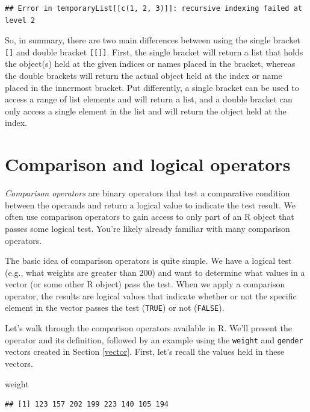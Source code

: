 \documentclass[
]{krantz}
\newenvironment{Shaded}{\begin{snugshade}}{\end{snugshade}}
\newcommand{\NormalTok}[1]{#1}
\begin{document}
\begin{verbatim}
## Error in temporaryList[[c(1, 2, 3)]]: recursive indexing failed at level 2
\end{verbatim}

So, in summary, there are two main differences between using the single bracket \texttt{{[}{]}} and double bracket \texttt{{[}{[}{]}{]}}. First, the single bracket will return a list that holds the object(s) held at the given indices or names placed in the bracket, whereas the double brackets will return the actual object held at the index or name placed in the innermost bracket. Put differently, a single bracket can be used to access a range of list elements and will return a list, and a double bracket can only access a single element in the list and will return the object held at the index.

\hypertarget{logicalOperators}{%
\section{Comparison and logical operators}\label{logicalOperators}}

\emph{Comparison operators} are binary operators that test a comparative condition between the operands and return a logical value to indicate the test result. We often use comparison operators to gain access to only part of an R object that passes some logical test. You're likely already familiar with many comparison operators.

The basic idea of comparison operators is quite simple. We have a logical test (e.g., what weights are greater than 200) and want to determine what values in a vector (or some other R object) pass the test. When we apply a comparison operator, the results are logical values that indicate whether or not the specific element in the vector passes the test (\texttt{TRUE}) or not (\texttt{FALSE}).

Let's walk through the comparison operators available in R. We'll present the operator and its definition, followed by an example using the \texttt{weight} and \texttt{gender} vectors created in Section \ref{vector}. First, let's recall the values held in these vectors.

\begin{Shaded}
\begin{Highlighting}[]
\NormalTok{weight}
\end{Highlighting}
\end{Shaded}

\begin{verbatim}
## [1] 123 157 202 199 223 140 105 194
\end{verbatim}
\end{document}
